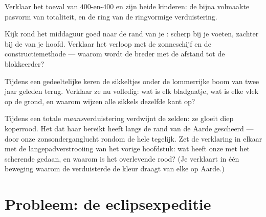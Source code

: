 \begin{exercise}[$\star\star$]\label{exo:g7:shadows-eclipses:9}
Verklaar het toeval van $400$-en-$400$ en zijn beide kinderen: de
bijna volmaakte pasvorm van totaliteit, en de ring van de ringvormige
verduistering.
\end{exercise}

\begin{exercise}[$\star\star$]\label{exo:g7:shadows-eclipses:10}
Kijk rond het middaguur goed naar de rand van je : scherp bij
je voeten, zachter bij de  van je hoofd. Verklaar het verloop
met de zonneschijf en de constructiemethode --- waarom wordt de
 breder met de afstand tot de blokkeerder?
\end{exercise}

\begin{exercise}[$\star\star$]\label{exo:g7:shadows-eclipses:11}
Tijdens een gedeeltelijke  keren de
sikkeltjes onder de lommerrijke boom van twee jaar geleden terug.
Verklaar ze nu volledig: wat is elk bladgaatje, wat is elke vlek op de
grond, en waarom wijzen alle sikkels dezelfde kant op?
\end{exercise}

\begin{exercise}[$\star\star\star$]\label{exo:g7:shadows-eclipses:12}
Tijdens een totale \emph{maans}verduistering verdwijnt de 
zelden: ze gloeit diep koperrood. Het  dat haar bereikt heeft
langs de rand van de Aarde gescheerd --- door onze
zonsonderganglucht rondom de hele  tegelijk. Zet de
verklaring in elkaar met de langepadverstrooiing van het vorige
hoofdstuk: wat heeft onze  met het scherende 
gedaan, en waarom is het overlevende  rood? (Je verklaart in één
beweging waarom de verduisterde  de kleur draagt van elke
 op Aarde.)
\end{exercise}

\section{Probleem: de eclipsexpeditie}

